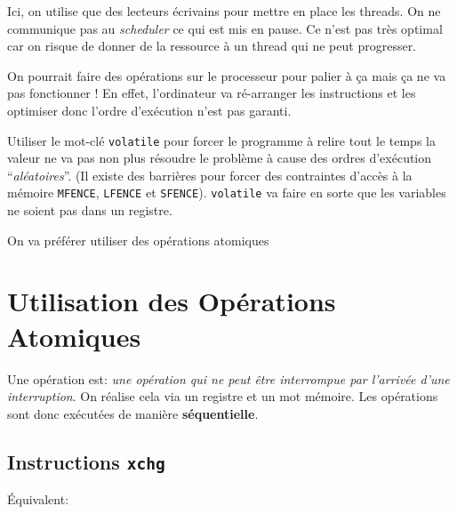 Ici, on utilise que des lecteurs écrivains pour mettre en place les
threads. On ne communique pas au \emph{scheduler} ce qui est mis en
pause. Ce n'est pas très optimal car on risque de donner de la ressource
à un thread qui ne peut progresser.

On pourrait faire des opérations sur le processeur pour palier à ça mais
ça ne va pas fonctionner ! En effet, l'ordinateur va ré-arranger les
instructions et les optimiser donc l'ordre d'exécution n'est pas
garanti.

Utiliser le mot-clé \texttt{volatile} pour forcer le programme à relire
tout le temps la valeur ne va pas non plus résoudre le problème à cause
des ordres d'exécution ``\emph{aléatoires}''. (Il existe des barrières
pour forcer des contraintes d'accès à la mémoire \texttt{MFENCE},
\texttt{LFENCE} et \texttt{SFENCE}). \texttt{volatile} va faire en sorte
que les variables ne soient pas dans un registre.

On va préférer utiliser des opérations atomiques

\section{Utilisation des Opérations
Atomiques}\label{utilisation-des-opuxe9rations-atomiques}

Une opération est: \emph{une opération qui ne peut être interrompue par
l'arrivée d'une interruption}. On réalise cela via un registre et un mot
mémoire. Les opérations sont donc exécutées de manière
\textbf{séquentielle}.

\subsection{\texorpdfstring{Instructions
\texttt{xchg}}{Instructions xchg}}\label{instructions-xchg}

\begin{Shaded}
\begin{Highlighting}[]
\end{Highlighting}
\end{Shaded}

Équivalent:

\begin{Shaded}
\begin{Highlighting}[]
\end{Highlighting}
\end{Shaded}

